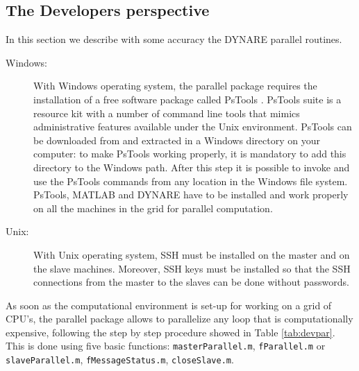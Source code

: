 \documentclass[12pt,a4paper,pdftex]{article}
\begin{document}
\subsection{The Developers perspective}


In this section we describe with some accuracy the DYNARE parallel routines.
\begin{description}
\item[Windows:]
With Windows operating system, the parallel package requires the installation of a free software package called PsTools \citep{PsTools}. PsTools suite is a resource kit with a number of command line tools that mimics administrative features available under the Unix environment. PsTools can be downloaded from \cite{PsTools} and extracted in a Windows directory on your computer: to make PsTools working properly, it is mandatory to add this directory to the Windows path. After this step it is possible to invoke and use the PsTools commands from any location in the Windows file system. PsTools, MATLAB and DYNARE have to be installed and work properly on all the machines in the grid for parallel computation.
\item[Unix:]
With Unix operating system, SSH must be installed on the master and on the slave machines. Moreover, SSH keys must be installed so that the SSH connections from the master to the slaves can be done without passwords.
\end{description}


As soon as the computational environment is set-up for working on a grid of CPU's, the parallel package allows to parallelize any loop that is computationally expensive, following the step by step procedure showed in Table \ref{tab:devpar}. This is done using five basic functions: \verb"masterParallel.m", \verb"fParallel.m" or \verb"slaveParallel.m", \verb"fMessageStatus.m", \verb"closeSlave.m".
\end{document}
